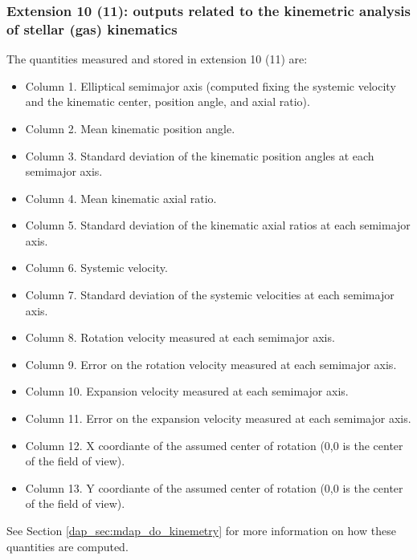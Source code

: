 \subsubsection{Extension 10 (11): outputs related to the kinemetric analysis of stellar (gas) kinematics}
The quantities measured and stored in extension 10 (11) are:
\begin{itemize}
\item Column 1. Elliptical semimajor axis (computed fixing the systemic velocity and the kinematic center, position angle, and axial ratio).
\item Column 2. Mean kinematic position angle.
\item Column 3. Standard deviation of the kinematic position angles at each semimajor axis.
\item Column 4. Mean kinematic axial ratio.
\item Column 5. Standard deviation of the kinematic axial ratios at each semimajor axis.
\item Column 6. Systemic velocity.
\item Column 7. Standard deviation of the systemic velocities at each semimajor axis.
\item Column 8. Rotation velocity measured at each semimajor axis.
\item Column 9. Error on the rotation velocity measured at each semimajor axis.
\item Column 10. Expansion velocity measured at each semimajor axis.
\item Column 11. Error on the expansion velocity measured at each semimajor axis.
\item Column 12. X coordiante of the assumed center of rotation (0,0 is the center of the field of view).
\item Column 13. Y coordiante of the assumed center of rotation (0,0 is the center of the field of view).

\end{itemize}



See Section \ref{dap_sec:mdap_do_kinemetry} for more information on how these quantities are computed.

